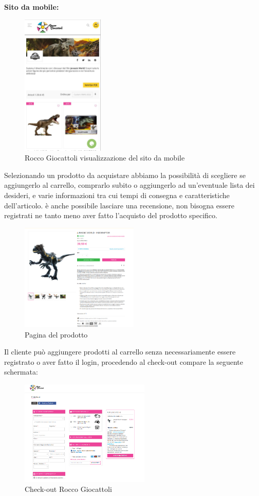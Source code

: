 \textbf{Sito da mobile:}
\begin{figure}[H]
        \centering
        \includegraphics[width=0.35\textwidth]{immagini/roccogiocattoli_mobile.jpg}
        \caption{Rocco Giocattoli visualizzazione del sito da mobile}
    \end{figure}
Selezionando un prodotto da acquistare abbiamo la possibilità di scegliere se aggiungerlo al carrello, comprarlo subito o aggiungerlo ad un'eventuale lista dei desideri, e varie informazioni tra cui tempi di consegna e caratteristiche dell'articolo. è anche possibile lasciare una recensione, non bisogna essere registrati ne tanto meno aver fatto l'acquisto del prodotto specifico. 
\begin{figure}[H]
        \centering
        \includegraphics[width=0.5\textwidth]{immagini/prodotto_roccogiocattoli.png}
        \caption{Pagina del prodotto }
    \end{figure}
Il cliente può aggiungere prodotti al carrello senza necessariamente essere registrato o aver fatto il login, procedendo al check-out compare la seguente schermata:
 \begin{figure}[H]
        \centering
        \includegraphics[width=0.55\textwidth]{immagini/check-out_roccogiocattoli.png}
        \caption{Check-out Rocco Giocattoli}
    \end{figure}
